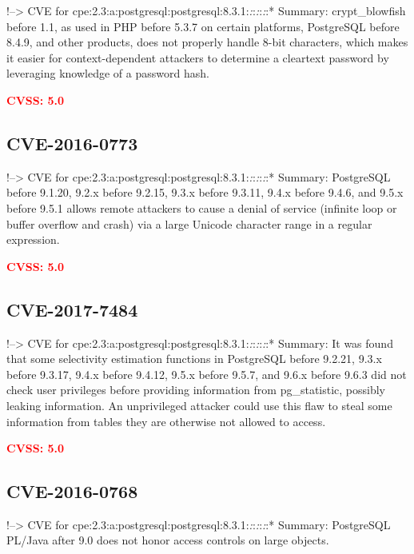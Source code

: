\documentclass[a4paper, 12pt]{article}
\begin{document}
!--\textgreater{} CVE for
cpe:2.3:a:postgresql:postgresql:8.3.1:\emph{:}:\emph{:}:\emph{:}:*
Summary: crypt\_blowfish before 1.1, as used in PHP before 5.3.7 on
certain platforms, PostgreSQL before 8.4.9, and other products, does not
properly handle 8-bit characters, which makes it easier for
context-dependent attackers to determine a cleartext password by
leveraging knowledge of a password hash.

\textbf{\textcolor{red}{CVSS: 5.0}}

\hypertarget{cve-2016-0773}{%
\subsection{CVE-2016-0773}\label{cve-2016-0773}}

!--\textgreater{} CVE for
cpe:2.3:a:postgresql:postgresql:8.3.1:\emph{:}:\emph{:}:\emph{:}:*
Summary: PostgreSQL before 9.1.20, 9.2.x before 9.2.15, 9.3.x before
9.3.11, 9.4.x before 9.4.6, and 9.5.x before 9.5.1 allows remote
attackers to cause a denial of service (infinite loop or buffer overflow
and crash) via a large Unicode character range in a regular expression.

\textbf{\textcolor{red}{CVSS: 5.0}}

\hypertarget{cve-2017-7484}{%
\subsection{CVE-2017-7484}\label{cve-2017-7484}}

!--\textgreater{} CVE for
cpe:2.3:a:postgresql:postgresql:8.3.1:\emph{:}:\emph{:}:\emph{:}:*
Summary: It was found that some selectivity estimation functions in
PostgreSQL before 9.2.21, 9.3.x before 9.3.17, 9.4.x before 9.4.12,
9.5.x before 9.5.7, and 9.6.x before 9.6.3 did not check user privileges
before providing information from pg\_statistic, possibly leaking
information. An unprivileged attacker could use this flaw to steal some
information from tables they are otherwise not allowed to access.

\textbf{\textcolor{red}{CVSS: 5.0}}

\hypertarget{cve-2016-0768}{%
\subsection{CVE-2016-0768}\label{cve-2016-0768}}

!--\textgreater{} CVE for
cpe:2.3:a:postgresql:postgresql:8.3.1:\emph{:}:\emph{:}:\emph{:}:*
Summary: PostgreSQL PL/Java after 9.0 does not honor access controls on
large objects.
\end{document}
